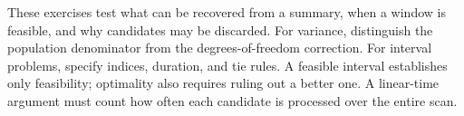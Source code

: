 These exercises test what can be recovered from a summary, when a window is feasible, and why candidates may be discarded. For variance, distinguish the population denominator from the degrees-of-freedom correction. For interval problems, specify indices, duration, and tie rules. A feasible interval establishes only feasibility; optimality also requires ruling out a better one. A linear-time argument must count how often each candidate is processed over the entire scan.
\par\smallskip
